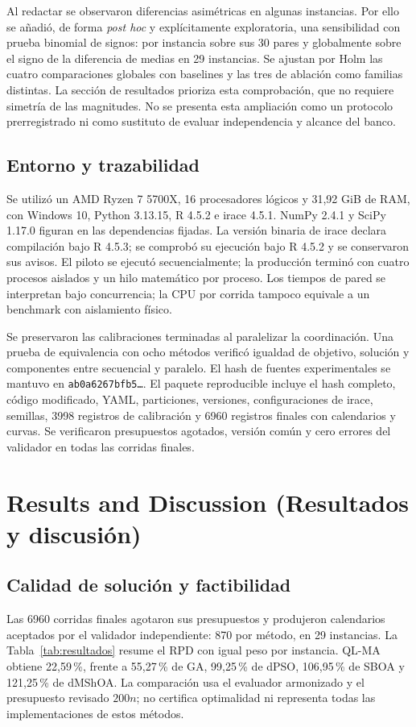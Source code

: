 \documentclass[11pt,a4paper]{article}
\begin{document}
Al redactar se observaron diferencias asimétricas en algunas instancias. Por ello se añadió, de forma \emph{post hoc} y explícitamente exploratoria, una sensibilidad con prueba binomial de signos: por instancia sobre sus 30 pares y globalmente sobre el signo de la diferencia de medias en 29 instancias. Se ajustan por Holm las cuatro comparaciones globales con baselines y las tres de ablación como familias distintas. La sección de resultados prioriza esta comprobación, que no requiere simetría de las magnitudes. No se presenta esta ampliación como un protocolo prerregistrado ni como sustituto de evaluar independencia y alcance del banco.

\subsection{Entorno y trazabilidad}
Se utilizó un AMD Ryzen 7 5700X, 16 procesadores lógicos y 31,92 GiB de RAM, con Windows 10, Python 3.13.15, R 4.5.2 e irace 4.5.1. NumPy 2.4.1 y SciPy 1.17.0 figuran en las dependencias fijadas. La versión binaria de irace declara compilación bajo R 4.5.3; se comprobó su ejecución bajo R 4.5.2 y se conservaron sus avisos. El piloto se ejecutó secuencialmente; la producción terminó con cuatro procesos aislados y un hilo matemático por proceso. Los tiempos de pared se interpretan bajo concurrencia; la CPU por corrida tampoco equivale a un benchmark con aislamiento físico.

Se preservaron las calibraciones terminadas al paralelizar la coordinación. Una prueba de equivalencia con ocho métodos verificó igualdad de objetivo, solución y componentes entre secuencial y paralelo. El hash de fuentes experimentales se mantuvo en \texttt{ab0a6267bfb5\ldots}. El paquete reproducible incluye el hash completo, código modificado, YAML, particiones, versiones, configuraciones de irace, semillas, 3998 registros de calibración y 6960 registros finales con calendarios y curvas. Se verificaron presupuestos agotados, versión común y cero errores del validador en todas las corridas finales.

\clearpage
{}
\section{Results and Discussion (Resultados y discusión)}
\label{sec:resultados}
\subsection{Calidad de solución y factibilidad}
Las 6960 corridas finales agotaron sus presupuestos y produjeron calendarios aceptados por el validador independiente: 870 por método, en 29 instancias. La Tabla~\ref{tab:resultados} resume el RPD con igual peso por instancia. QL-MA obtiene 22,59\,\%, frente a 55,27\,\% de GA, 99,25\,\% de dPSO, 106,95\,\% de SBOA y 121,25\,\% de dMShOA. La comparación usa el evaluador armonizado y el presupuesto revisado $200n$; no certifica optimalidad ni representa todas las implementaciones de estos métodos.
\end{document}
